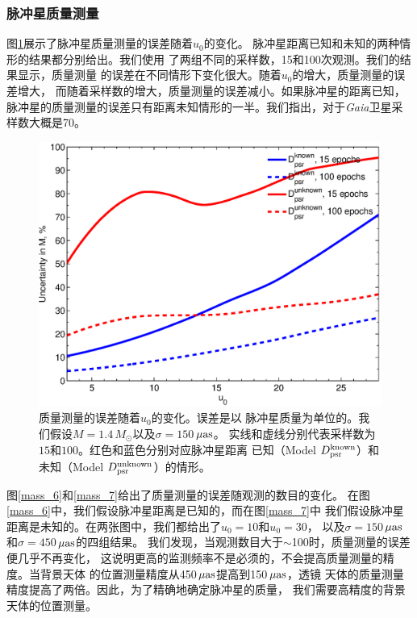 \subsubsection{脉冲星质量测量}


图\ref{mass_u0}展示了脉冲星质量测量的误差随着$u_0$的变化。
脉冲星距离已知和未知的两种情形的结果都分别给出。我们使用
了两组不同的采样数，15和100次观测。我们的结果显示，质量测量
的误差在不同情形下变化很大。随着$u_0$的增大，质量测量的误差增大，
而随着采样数的增大，质量测量的误差减小。如果脉冲星的距离已知，
脉冲星的质量测量的误差只有距离未知情形的一半。我们指出，对于\textit{Gaia}卫星采样数大概是70\supercite{DeBruijne12}。
%
\begin{figure}
\begin{center}
  \includegraphics[width=4 in,trim=0 0 0 3.2cm]{u0_mass.eps}
%
\caption{质量测量的误差随着$u_0$的变化。误差是以
脉冲星质量为单位的。我们假设$M=1.4$\,$M_{\odot}$以及$\sigma=150$\,$\rm{\mu as}$。
实线和虚线分别代表采样数为$15$和$100$。红色和蓝色分别对应脉冲星距离
已知（Model $D_{\rm{psr}}^{\rm{known}}$）和未知（Model $D_{\rm{psr}}^{\rm{unknown}}$）的情形。
}
\label{mass_u0}
\end{center}
\end{figure}

图\ref{mass_6}和\ref{mass_7}给出了质量测量的误差随观测的数目的变化。
在图\ref{mass_6}中，我们假设脉冲星距离是已知的，而在图\ref{mass_7}中
我们假设脉冲星距离是未知的。在两张图中，我们都给出了$u_0=10$和$u_0=30$，
以及$\sigma=150$\,$\rm{\mu as}$和$\sigma=450$\,$\rm{\mu as}$的四组结果。
我们发现，当观测数目大于$\sim$100时，质量测量的误差便几乎不再变化，
这说明更高的监测频率不是必须的，不会提高质量测量的精度。当背景天体
的位置测量精度从450\,$\rm{\mu as}$提高到150\,$\rm{\mu as}$，透镜
天体的质量测量精度提高了两倍。因此，为了精确地确定脉冲星的质量，
我们需要高精度的背景天体的位置测量。


